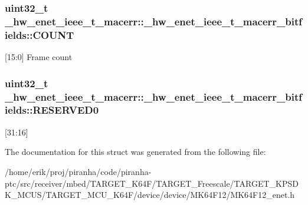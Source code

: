 \subsubsection[{\texorpdfstring{C\+O\+U\+NT}{COUNT}}]{\setlength{\rightskip}{0pt plus 5cm}uint32\+\_\+t \+\_\+hw\+\_\+enet\+\_\+ieee\+\_\+t\+\_\+macerr\+::\+\_\+hw\+\_\+enet\+\_\+ieee\+\_\+t\+\_\+macerr\+\_\+bitfields\+::\+C\+O\+U\+NT}\hypertarget{struct__hw__enet__ieee__t__macerr_1_1__hw__enet__ieee__t__macerr__bitfields_a93ca41452b10bb6f5e8531cd8fe35efa}{}\label{struct__hw__enet__ieee__t__macerr_1_1__hw__enet__ieee__t__macerr__bitfields_a93ca41452b10bb6f5e8531cd8fe35efa}
\mbox{[}15\+:0\mbox{]} Frame count 
\subsubsection[{\texorpdfstring{R\+E\+S\+E\+R\+V\+E\+D0}{RESERVED0}}]{\setlength{\rightskip}{0pt plus 5cm}uint32\+\_\+t \+\_\+hw\+\_\+enet\+\_\+ieee\+\_\+t\+\_\+macerr\+::\+\_\+hw\+\_\+enet\+\_\+ieee\+\_\+t\+\_\+macerr\+\_\+bitfields\+::\+R\+E\+S\+E\+R\+V\+E\+D0}\hypertarget{struct__hw__enet__ieee__t__macerr_1_1__hw__enet__ieee__t__macerr__bitfields_aec13729f7cbf3cb4e7cd393459495a7a}{}\label{struct__hw__enet__ieee__t__macerr_1_1__hw__enet__ieee__t__macerr__bitfields_aec13729f7cbf3cb4e7cd393459495a7a}
\mbox{[}31\+:16\mbox{]} 

The documentation for this struct was generated from the following file\+:\begin{DoxyCompactItemize}
\item 
/home/erik/proj/piranha/code/piranha-\/ptc/src/receiver/mbed/\+T\+A\+R\+G\+E\+T\+\_\+\+K64\+F/\+T\+A\+R\+G\+E\+T\+\_\+\+Freescale/\+T\+A\+R\+G\+E\+T\+\_\+\+K\+P\+S\+D\+K\+\_\+\+M\+C\+U\+S/\+T\+A\+R\+G\+E\+T\+\_\+\+M\+C\+U\+\_\+\+K64\+F/device/device/\+M\+K64\+F12/M\+K64\+F12\+\_\+enet.\+h\end{DoxyCompactItemize}
